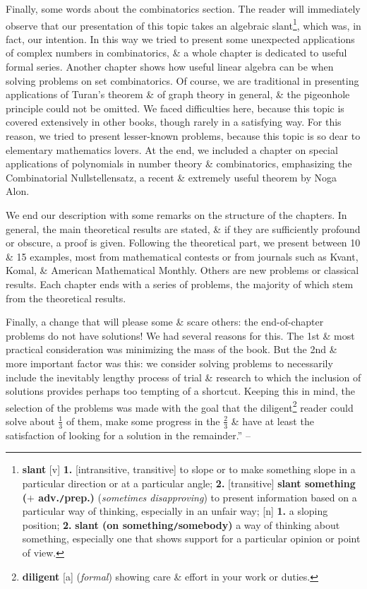 \documentclass[oneside]{book}
\numberwithin{equation}{section}
\begin{document}
Finally, some words about the combinatorics section. The reader will immediately observe that our presentation of this topic takes an algebraic slant\footnote{\textbf{slant} [v] \textbf{1.} [intransitive, transitive] to slope or to make something slope in a particular direction or at a particular angle; \textbf{2.} [transitive] \textbf{slant something ($+$ adv.\texttt{/}prep.)} (\textit{sometimes disapproving}) to present information based on a particular way of thinking, especially in an unfair way; [n] \textbf{1.} a sloping position; \textbf{2.} \textbf{slant (on something\texttt{/}somebody)} a way of thinking about something, especially one that shows support for a particular opinion or point of view.}, which was, in fact, our intention. In this way we tried to present some unexpected applications of complex numbers in combinatorics, \& a whole chapter is dedicated to useful formal series. Another chapter shows how useful linear algebra can be when solving problems on set combinatorics. Of course, we are traditional in presenting applications of Turan's theorem \& of graph theory in general, \& the pigeonhole principle could not be omitted. We faced difficulties here, because this topic is covered extensively in other books, though rarely in a satisfying way. For this reason, we tried to present lesser-known problems, because this topic is so dear to elementary mathematics lovers. At the end, we included a chapter on special applications of polynomials in number theory \& combinatorics, emphasizing the Combinatorial Nullstellensatz, a recent \& extremely useful theorem by Noga Alon.

We end our description with some remarks on the structure of the chapters. In general, the main theoretical results are stated, \& if they are sufficiently profound or obscure, a proof is given. Following the theoretical part, we present between 10 \& 15 examples, most from mathematical contests or from journals such as Kvant, Komal, \& American Mathematical Monthly. Others are new problems or classical results. Each chapter ends with a series of problems, the majority of which stem from the theoretical results.

Finally, a change that will please some \& scare others: the end-of-chapter problems do not have solutions! We had several reasons for this. The 1st \& most practical consideration was minimizing the mass of the book. But the 2nd \& more important factor was this: we consider solving problems to necessarily include the inevitably lengthy process of trial \& research to which the inclusion of solutions provides perhaps too tempting of a shortcut. Keeping this in mind, the selection of the problems was made with the goal that the diligent\footnote{\textbf{diligent} [a] (\textit{formal}) showing care \& effort in your work or duties.} reader could solve about $\frac{1}{3}$ of them, make some progress in the $\frac{2}{3}$ \& have at least the satisfaction of looking for a solution in the remainder.'' -- \cite[Preface, pp. vii--xi]{Andreescu_Dospinescu2010}
\end{document}
